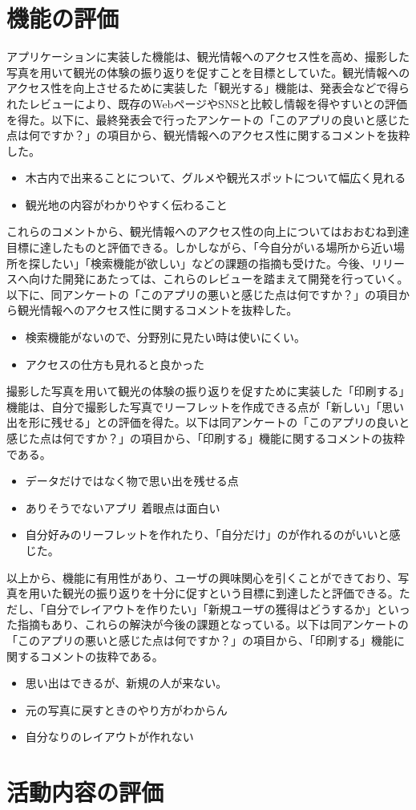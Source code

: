 \section{機能の評価}
アプリケーションに実装した機能は、観光情報へのアクセス性を高め、撮影した写真を用いて観光の体験の振り返りを促すことを目標としていた。観光情報へのアクセス性を向上させるために実装した「観光する」機能は、発表会などで得られたレビューにより、既存のWebページやSNSと比較し情報を得やすいとの評価を得た。以下に、最終発表会で行ったアンケートの「このアプリの良いと感じた点は何ですか？」の項目から、観光情報へのアクセス性に関するコメントを抜粋した。
\begin{itemize}
\item 木古内で出来ることについて、グルメや観光スポットについて幅広く見れる
\item 観光地の内容がわかりやすく伝わること
\end{itemize}
これらのコメントから、観光情報へのアクセス性の向上についてはおおむね到達目標に達したものと評価できる。しかしながら、「今自分がいる場所から近い場所を探したい」「検索機能が欲しい」などの課題の指摘も受けた。今後、リリースへ向けた開発にあたっては、これらのレビューを踏まえて開発を行っていく。以下に、同アンケートの「このアプリの悪いと感じた点は何ですか？」の項目から観光情報へのアクセス性に関するコメントを抜粋した。
\begin{itemize}
\item 検索機能がないので、分野別に見たい時は使いにくい。
\item アクセスの仕方も見れると良かった
\end{itemize}
撮影した写真を用いて観光の体験の振り返りを促すために実装した「印刷する」機能は、自分で撮影した写真でリーフレットを作成できる点が「新しい」「思い出を形に残せる」との評価を得た。以下は同アンケートの「このアプリの良いと感じた点は何ですか？」の項目から、「印刷する」機能に関するコメントの抜粋である。
\begin{itemize}
\item データだけではなく物で思い出を残せる点
\item ありそうでないアプリ 着眼点は面白い
\item 自分好みのリーフレットを作れたり、「自分だけ」のが作れるのがいいと感じた。
\end{itemize}
以上から、機能に有用性があり、ユーザの興味関心を引くことができており、写真を用いた観光の振り返りを十分に促すという目標に到達したと評価できる。ただし、「自分でレイアウトを作りたい」「新規ユーザの獲得はどうするか」といった指摘もあり、これらの解決が今後の課題となっている。以下は同アンケートの「このアプリの悪いと感じた点は何ですか？」の項目から、「印刷する」機能に関するコメントの抜粋である。
\begin{itemize}
\item 思い出はできるが、新規の人が来ない。
\item 元の写真に戻すときのやり方がわからん
\item 自分なりのレイアウトが作れない
\end{itemize}

\section{活動内容の評価}

